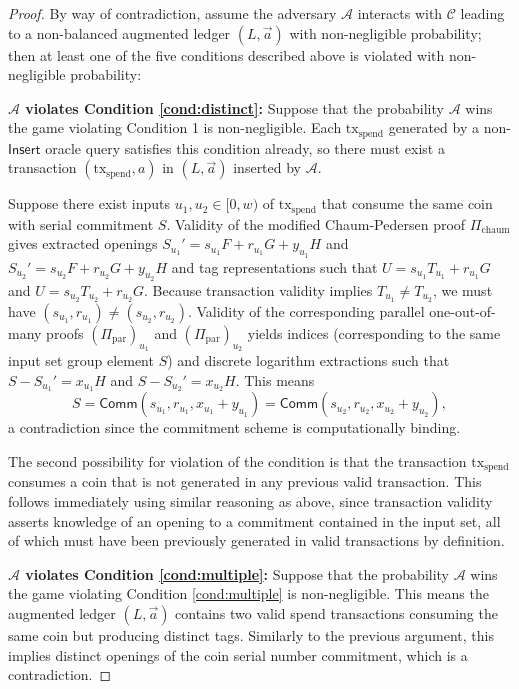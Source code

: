 \documentclass{llncs}
\newcommand{\func}[1]{\mathsf{#1}}
\newcommand{\comm}{\func{Comm}}
\begin{document}
\begin{proof}
By way of contradiction, assume the adversary $\mathcal{A}$ interacts with $\mathcal{C}$ leading to a non-balanced augmented ledger $(L, \vec{a})$ with non-negligible probability; then at least one of the five conditions described above is violated with non-negligible probability:

\textbf{$\mathcal{A}$ violates Condition \ref{cond:distinct}:} Suppose that the probability $\mathcal{A}$ wins the game violating Condition 1 is non-negligible.
Each $\text{tx}_{\text{spend}}$ generated by a non-$\func{Insert}$ oracle query satisfies this condition already, so there must exist a transaction $(\text{tx}_{\text{spend}}, a)$ in $(L, \vec{a})$ inserted by $\mathcal{A}$.

Suppose there exist inputs $u_1,u_2 \in [0,w)$ of $\text{tx}_{\text{spend}}$ that consume the same coin with serial commitment $S$.
Validity of the modified Chaum-Pedersen proof $\Pi_{\text{chaum}}$ gives extracted openings $S_{u_1}' = s_{u_1} F + r_{u_1} G + y_{u_1} H$ and $S_{u_2}' = s_{u_2} F + r_{u_2} G + y_{u_2} H$ and tag representations such that $U = s_{u_1} T_{u_1} + r_{u_1} G$ and $U = s_{u_2} T_{u_2} + r_{u_2} G$.
Because transaction validity implies $T_{u_1} \neq T_{u_2}$, we must have $(s_{u_1},r_{u_1}) \neq (s_{u_2},r_{u_2})$.
Validity of the corresponding parallel one-out-of-many proofs $(\Pi_{\text{par}})_{u_1}$ and $(\Pi_{\text{par}})_{u_2}$ yields indices (corresponding to the same input set group element $S$) and discrete logarithm extractions such that $S - S_{u_1}' = x_{u_1} H$ and $S - S_{u_2}' = x_{u_2} H$.
This means
$$S = \comm(s_{u_1},r_{u_1},x_{u_1}+y_{u_1}) = \comm(s_{u_2},r_{u_2},x_{u_2}+y_{u_2}),$$
a contradiction since the commitment scheme is computationally binding.

The second possibility for violation of the condition is that the transaction $\text{tx}_{\text{spend}}$ consumes a coin that is not generated in any previous valid transaction.
This follows immediately using similar reasoning as above, since transaction validity asserts knowledge of an opening to a commitment contained in the input set, all of which must have been previously generated in valid transactions by definition.

\textbf{$\mathcal{A}$ violates Condition \ref{cond:multiple}:} Suppose that the probability $\mathcal{A}$ wins the game violating Condition \ref{cond:multiple} is non-negligible.
This means the augmented ledger $(L, \vec{a})$ contains two valid spend transactions consuming the same coin but producing distinct tags.
Similarly to the previous argument, this implies distinct openings of the coin serial number commitment, which is a contradiction.


\end{proof}
\end{document}
